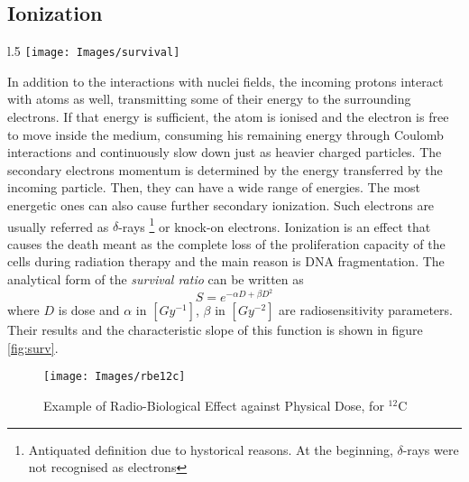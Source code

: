\documentclass[12pt, a4paper, twoside]{book}
\begin{document}
\subsection{Ionization}
\begin{wrapfigure}{l}{.5\textwidth}
\vspace{-6mm}
\centering
{\texttt{[image: Images/survival]}}
\caption{CHO cells Survival ratio realted with sose, for $X$-rays and $^{12}$C ions. From Weyrather (et al.) \cite{weyr:rbe}}
\label{fig:surv}
\vspace{-10mm}
\end{wrapfigure}
In addition to the interactions with nuclei fields, the incoming protons interact with atoms as well, transmitting some of their energy to the surrounding electrons. If that energy is sufficient, the atom is ionised and the electron is free to move inside the medium, consuming his remaining energy through Coulomb interactions and continuously slow down just as heavier charged particles. The secondary electrons momentum is determined by the energy transferred by the incoming particle. Then, they can have a wide range of energies. The most energetic ones can also cause further secondary ionization. 
Such electrons are usually referred as $\delta$-rays \footnote{Antiquated definition due to hystorical reasons. At the beginning, $\delta$-rays were not recognised as electrons} or knock-on electrons.
Ionization is an effect that causes the death meant as the complete loss of the proliferation capacity of the cells during radiation therapy and the main reason is DNA fragmentation. The analytical form of the \emph{survival ratio} can be written as
\[
S = e^{-\alpha D + \beta D^2}
\]
where $D$ is dose and $\alpha$ in $[Gy^{-1}]$, $\beta$ in $[Gy^{-2}]$ are radiosensitivity parameters.
Their results and the characteristic slope of this function is shown in figure \ref{fig:surv}.
\begin{figure}[!t]
\texttt{[image: Images/rbe12c]}
\caption{Example of Radio-Biological Effect against Physical Dose, for $^{12}$C}
\label{fig:rbe12c}
\end{figure}
\end{document}
